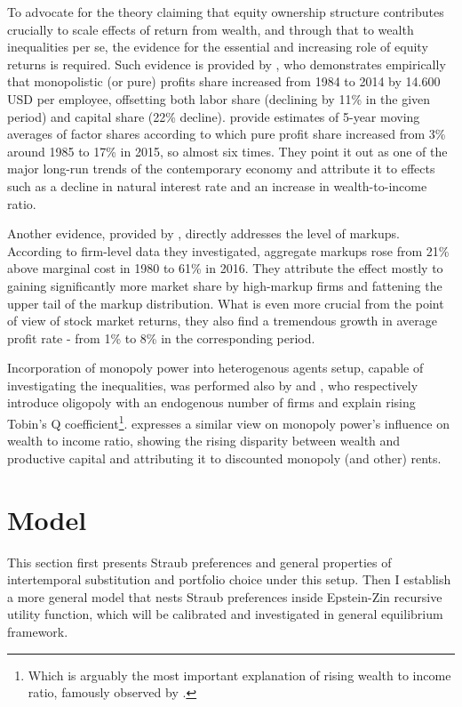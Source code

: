 \documentclass[12pt]{article}
\begin{document}
To advocate for the theory claiming that equity ownership structure contributes crucially to scale effects of return from wealth, and through that to wealth inequalities per se, the evidence for the essential and increasing role of equity returns is required. Such evidence is provided by \textcite{barkai2020}, who demonstrates empirically that monopolistic (or pure) profits share increased from 1984 to 2014 by 14.600 USD per employee, offsetting both labor share (declining by 11\% in the given period) and capital share (22\% decline). \textcite{eggertsson2021} provide estimates of 5-year moving averages of factor shares according to which pure profit share increased from 3\% around 1985 to 17\% in 2015, so almost six times. They point it out as one of the major long-run trends of the contemporary economy and attribute it to effects such as a decline in natural interest rate and an increase in wealth-to-income ratio.

Another evidence, provided by \textcite{deLoecker2020}, directly addresses the level of markups. According to firm-level data they investigated, aggregate markups rose from 21\% above marginal cost in 1980 to 61\% in 2016. They attribute the effect mostly to gaining significantly more market share by high-markup firms and fattening the upper tail of the markup distribution. What is even more crucial from the point of view of stock market returns, they also find a tremendous growth in average profit rate - from 1\% to 8\% in the corresponding period.

Incorporation of monopoly power into heterogenous agents setup, capable of investigating the inequalities, was performed also by \textcite{colciago2019} and \textcite{brun2017}, who respectively introduce oligopoly with an endogenous number of firms and explain rising Tobin's Q coefficient\footnote{Which is arguably the most important explanation of rising wealth to income ratio, famously observed by \textcite{piketty2014}.}. \textcite{piketty2014} expresses a similar view on monopoly power's influence on wealth to income ratio, showing the rising disparity between wealth and productive capital and attributing it to discounted monopoly (and other) rents.

\section{Model}
\label{sec:model}

This section first presents Straub preferences and general properties of intertemporal substitution and portfolio choice under this setup. Then I establish a more general model that nests Straub preferences inside Epstein-Zin recursive utility function, which will be calibrated and investigated in general equilibrium framework.
\end{document}
